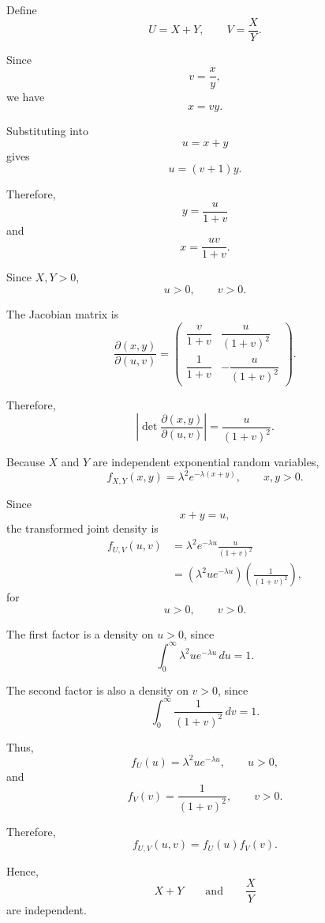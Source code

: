 \documentclass[11pt]{article}
\newenvironment{solution}{
    \par
    \begin{tcolorbox}[
        colback=white,
        colframe=uwgold,
        boxrule=0.7pt,
        arc=2mm,
        left=3mm,
        right=3mm,
        top=2mm,
        bottom=2mm,
        breakable,
        before skip=0.5em,
        after skip=1em,
        title=\textbf{Solution},
        coltitle=uwpurple,
        fonttitle=\bfseries
    ]
}{
    \end{tcolorbox}
}
\begin{document}
\begin{solution}

Define
\[
U=X+Y,
\qquad
V=\frac XY.
\]

Since
\[
v=\frac xy,
\]
we have
\[
x=vy.
\]

Substituting into
\[
u=x+y
\]
gives
\[
u=(v+1)y.
\]

Therefore,
\[
y=\frac{u}{1+v}
\]
and
\[
x=\frac{uv}{1+v}.
\]

Since \(X,Y>0\),
\[
u>0,
\qquad
v>0.
\]

The Jacobian matrix is
\[
\frac{\partial(x,y)}{\partial(u,v)}
=
\begin{pmatrix}
\dfrac{v}{1+v}
&
\dfrac{u}{(1+v)^2}
\\[3mm]
\dfrac1{1+v}
&
-\dfrac{u}{(1+v)^2}
\end{pmatrix}.
\]

Therefore,
\[
\left|
\det
\frac{\partial(x,y)}{\partial(u,v)}
\right|
=
\frac{u}{(1+v)^2}.
\]

Because \(X\) and \(Y\) are independent exponential random variables,
\[
f_{X,Y}(x,y)
=
\lambda^2e^{-\lambda(x+y)},
\qquad x,y>0.
\]

Since
\[
x+y=u,
\]
the transformed joint density is
\[
\begin{aligned}
f_{U,V}(u,v)
&=
\lambda^2e^{-\lambda u}
\frac{u}{(1+v)^2}\\
&=
\left(
\lambda^2u e^{-\lambda u}
\right)
\left(
\frac1{(1+v)^2}
\right),
\end{aligned}
\]
for
\[
u>0,
\qquad
v>0.
\]

The first factor is a density on \(u>0\), since
\[
\int_0^\infty
\lambda^2u e^{-\lambda u}\,du
=
1.
\]

The second factor is also a density on \(v>0\), since
\[
\int_0^\infty
\frac1{(1+v)^2}\,dv
=
1.
\]

Thus,
\[
f_U(u)
=
\lambda^2u e^{-\lambda u},
\qquad u>0,
\]
and
\[
f_V(v)
=
\frac1{(1+v)^2},
\qquad v>0.
\]

Therefore,
\[
f_{U,V}(u,v)
=
f_U(u)f_V(v).
\]

Hence,
\[
X+Y
\qquad\text{and}\qquad
\frac XY
\]
are independent.

\end{solution}




 






\end{document}
